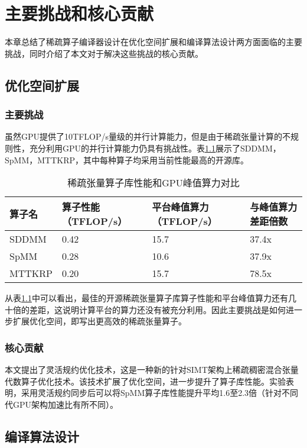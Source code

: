
\chapter{主要挑战和核心贡献}
本章总结了稀疏算子编译器设计在优化空间扩展和编译算法设计两方面面临的主要挑战，同时介绍了本文对于解决这些挑战的核心贡献。
\section{优化空间扩展}
\subsection{主要挑战}
虽然GPU提供了10TFLOP/s量级的并行计算能力，但是由于稀疏张量计算的不规则性，充分利用GPU的并行计算能力仍具有挑战性。表\ref{tab:motivation-1}展示了SDDMM\cite{yu2021exploiting}，SpMM\cite{huang2020ge}，MTTKRP\cite{nisa2019mttkrp}，其中每种算子均采用当前性能最高的开源库。
\begin{table}
  \centering
  \caption{稀疏张量算子库性能和GPU峰值算力对比}
  \begin{tabular}{llll}
    \toprule
    算子名  & 算子性能（TFLOP/s） & 平台峰值算力（TFLOP/s） & 与峰值算力差距倍数   \\
    \midrule
    SDDMM  & 0.42 & 15.7 & 37.4x \\
    SpMM   & 0.28 & 10.6 & 37.9x \\
    MTTKRP & 0.20 & 15.7 & 78.5x \\
    \bottomrule
  \end{tabular}
  \label{tab:motivation-1}
\end{table}
从表\ref{tab:motivation-1}中可以看出，最佳的开源稀疏张量算子库算子性能和平台峰值算力还有几十倍的差距，这说明计算平台的算力还没有被充分利用。因此主要挑战是如何进一步扩展优化空间，即写出更高效的稀疏张量算子。
\subsection{核心贡献}
本文提出了灵活规约优化技术，这是一种新的针对SIMT架构上稀疏稠密混合张量代数算子优化技术。该技术扩展了优化空间，进一步提升了算子库性能。实验表明，采用灵活规约同步后可以将SpMM算子库性能提升平均1.6至2.3倍（针对不同代GPU架构加速比有所不同）。
\section{编译算法设计}
